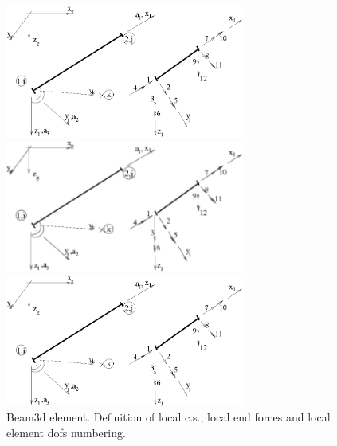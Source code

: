 \documentclass[a4paper]{article}
\begin{document}
\begin{figure}[tb]
\begin{htmlonly}
  \centerline{\includegraphics[width=0.7\textwidth]{beam3d.eps}}
\end{htmlonly}
\ifpdf
\centerline{\includegraphics[width=0.7\textwidth]{beam3d.pdf}}
\else
\centerline{\includegraphics[width=0.7\textwidth]{beam3d.eps}}
\fi
\caption{Beam3d element. Definition of local c.s., local end forces
and local element dofs numbering.}
\label{beam3dfig}
\end{figure}
\end{document}
